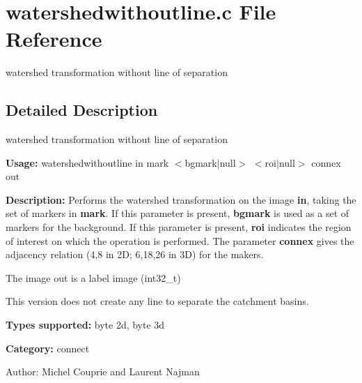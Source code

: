 \section{watershedwithoutline.c File Reference}
\label{watershedwithoutline_8c}
watershed transformation without line of separation  




\label{_details}
\subsection{Detailed Description}
watershed transformation without line of separation 

{\bf Usage:} watershedwithoutline in mark $<$bgmark$|$null$>$ $<$roi$|$null$>$ connex out

{\bf Description:} Performs the watershed transformation on the image {\bf in}, taking the set of markers in {\bf mark}. If this parameter is present, {\bf bgmark} is used as a set of markers for the background. If this parameter is present, {\bf roi} indicates the region of interest on which the operation is performed. The parameter {\bf connex} gives the adjacency relation (4,8 in 2D; 6,18,26 in 3D) for the makers.

The image out is a label image (int32\_\-t)

This version does not create any line to separate the catchment basins.

{\bf Types supported:} byte 2d, byte 3d

{\bf Category:} connect

\begin{Desc}
\item[Author:]Michel Couprie and Laurent Najman \end{Desc}
